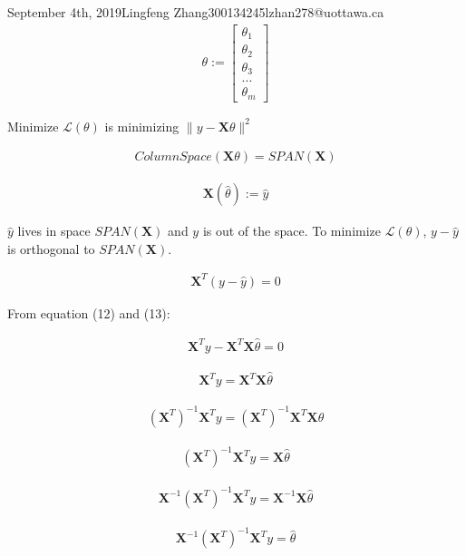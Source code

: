 \documentclass{article}
\begin{document}
\begin{lecture}{September 4th, 2019}{Lingfeng Zhang}{300134245}{lzhan278@uottawa.ca}
\begin{eqnarray}\theta:= 
\left[ {\begin{array}{c}
   \theta_1 \\
   \theta_2 \\
   \theta_3 \\
   ... \\
   \theta_m
  \end{array} } \right]\end{eqnarray}
  
Minimize $\mathcal{L}(\theta)$ is minimizing $\parallel y-\textbf{X}\theta\parallel ^2$

\begin{eqnarray}Column Space(\textbf{X}\theta) = SPAN(\textbf{X})\end{eqnarray}

\begin{eqnarray}\textbf{X}(\hat\theta) := \hat y\end{eqnarray}

$\hat y$ lives in space $SPAN(\textbf{X})$ and $y$ is out of the space. To minimize $\mathcal{L}(\theta)$, $y - \hat y$ is orthogonal to $SPAN(\textbf{X})$.

\begin{eqnarray}
\textbf{X} ^T(y-\hat y) = 0
\end{eqnarray}

From equation (12) and (13):

\begin{eqnarray}
\textbf{X} ^Ty-\textbf{X} ^T\textbf{X}\hat \theta = 0
\end{eqnarray}

\begin{eqnarray}
\textbf{X} ^Ty=\textbf{X} ^T\textbf{X}\hat \theta 
\end{eqnarray}

\begin{eqnarray}
(\textbf{X} ^T)^{-1}\textbf{X} ^Ty=(\textbf{X} ^T)^{-1}\textbf{X} ^T\textbf{X}\hat \theta 
\end{eqnarray}

\begin{eqnarray}
(\textbf{X} ^T)^{-1}\textbf{X} ^Ty=\textbf{X}\hat \theta 
\end{eqnarray}

\begin{eqnarray}
\textbf{X}^{-1}(\textbf{X} ^T)^{-1}\textbf{X} ^Ty=\textbf{X}^{-1}\textbf{X}\hat \theta 
\end{eqnarray}

\begin{eqnarray}
\textbf{X}^{-1}(\textbf{X} ^T)^{-1}\textbf{X} ^Ty=\hat \theta 
\end{eqnarray}


\end{lecture}
\end{document}

